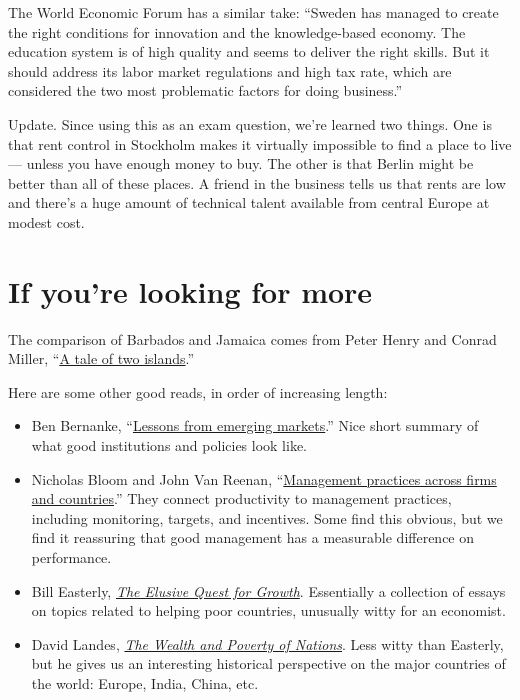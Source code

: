 \begin{enumerate}
\begin{enumerate}
The World Economic Forum has a similar take:
``Sweden has managed to create the right conditions for innovation
and the knowledge-based economy.
The education system is of high quality and seems to deliver the right skills.
But it should address its labor market regulations and high tax rate,
which are considered the two most problematic factors for doing business.''
\end{enumerate}

Update.  Since using this as an exam question, we're learned two things.  
One is that rent control in Stockholm makes it virtually impossible to find a
place to live --- unless you have enough money to buy.  
The other is that Berlin might be better than all of these places.  
A friend in the business tells us that rents are low and there's a huge amount
of technical talent available from central Europe at modest cost.  

\end{enumerate}


\section*{If you're looking for more}

The comparison of Barbados and Jamaica comes from Peter Henry and Conrad Miller,
``\href{{http://www.aeaweb.org/articles.php?doi=10.1257/aer.99.2.261}}
{A tale of two islands}.''

Here are some other good reads, in order of increasing length:
\begin{itemize}
\item Ben Bernanke,
``\href{http://www.federalreserve.gov/newsevents/speech/Bernanke20110928a.htm}
{Lessons from emerging markets}.''
Nice short summary of what good institutions and policies look like.

\item Nicholas Bloom and John Van Reenan,
``\href{http://www.aeaweb.org/articles.php?doi=10.1257/jep.24.1.203}
    {Management practices across firms and countries}.''
They connect productivity to management practices, including
monitoring, targets, and incentives.
Some find this obvious, but we find it reassuring that
good management has a measurable difference
on performance.

\item Bill Easterly,
\href{http://www.amazon.com/Elusive-Quest-Growth-Economists-Misadventures/dp/0262550423}
{\it The Elusive Quest for Growth}.
Essentially a collection of essays on topics related to helping poor countries,
unusually witty for an economist.

\item David Landes,
\href{http://www.amazon.com/Wealth-Poverty-Nations-Some-Rich/dp/0393318885}
{\it The Wealth and Poverty of Nations}.
Less witty than Easterly, but he gives us an interesting historical
perspective on the major countries of the world:  Europe, India, China, etc.
\end{itemize}

